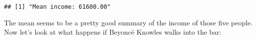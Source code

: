 \documentclass[]{book}
\newenvironment{Shaded}{\begin{snugshade}}{\end{snugshade}}
\newcommand{\KeywordTok}[1]{\textcolor[rgb]{0.13,0.29,0.53}{\textbf{#1}}}
\newcommand{\DataTypeTok}[1]{\textcolor[rgb]{0.13,0.29,0.53}{#1}}
\newcommand{\DecValTok}[1]{\textcolor[rgb]{0.00,0.00,0.81}{#1}}
\newcommand{\StringTok}[1]{\textcolor[rgb]{0.31,0.60,0.02}{#1}}
\newcommand{\CommentTok}[1]{\textcolor[rgb]{0.56,0.35,0.01}{\textit{#1}}}
\newcommand{\OperatorTok}[1]{\textcolor[rgb]{0.81,0.36,0.00}{\textbf{#1}}}
\newcommand{\NormalTok}[1]{#1}
\theoremstyle{definition}
\theoremstyle{definition}
\theoremstyle{definition}
\theoremstyle{remark}
\begin{document}
\begin{verbatim}
## [1] "Mean income: 61600.00"
\end{verbatim}

The mean seems to be a pretty good summary of the income of those five
people. Now let's look at what happens if Beyoncé Knowles walks into the
bar:

\begin{Shaded}
\end{Shaded}
\end{document}
